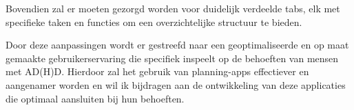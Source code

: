 Bovendien zal er moeten gezorgd worden voor duidelijk verdeelde tabs, elk met specifieke taken en functies om een overzichtelijke structuur te bieden. \newline
 
Door deze aanpassingen wordt er gestreefd naar een geoptimaliseerde en op maat gemaakte gebruikerservaring die specifiek inspeelt op de behoeften van mensen met AD(H)D. Hierdoor zal het gebruik van planning-apps effectiever en aangenamer worden en wil ik bijdragen aan de ontwikkeling van deze applicaties die optimaal aansluiten bij hun behoeften.

